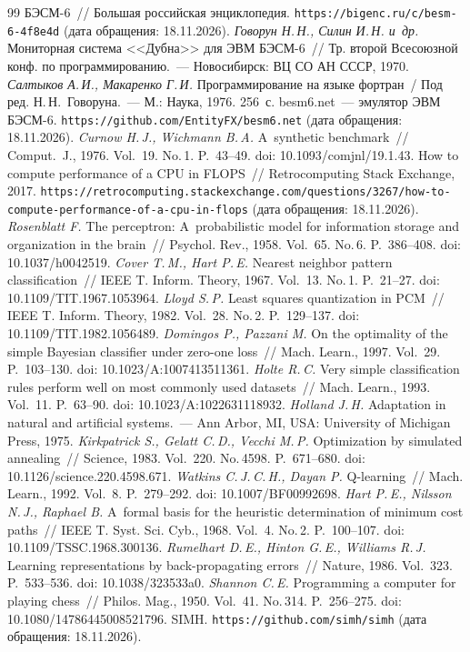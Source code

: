 \documentclass[a4paper,12pt]{article}
\begin{document}
{\small\frenchspacing
  \begin{thebibliography}{99}
БЭСМ-6~// Большая российская энциклопедия. \texttt{https://bigenc.ru/c/besm-6-4f8e4d} (дата обращения: 18.11.2026).
{\it Говорун Н.\,Н., Силин И.\,Н. и~др.} Мониторная система <<Дубна>> для ЭВМ БЭСМ-6~// Тр. второй Всесоюзной конф. по программированию.~--- Новосибирск: ВЦ СО АН СССР, 1970.
{\it Салтыков А.\,И., Макаренко Г.\,И.} Программирование на языке фортран~/ Под ред. Н.\,Н.~Говоруна.~--- М.: Наука, 1976. 256~с.
besm6.net~--- эмулятор ЭВМ БЭСМ-6. \texttt{https://github.com/EntityFX/besm6.net} (дата обращения: 18.11.2026).
{\it Curnow H.\,J., Wichmann B.\,A.} A~synthetic benchmark~// Comput.~J., 1976. Vol.~19. No.\,1. P.~43--49. doi: 10.1093/comjnl/19.1.43.
How to compute performance of a CPU in FLOPS~// Retrocomputing Stack Exchange, 2017. \texttt{https://retrocomputing.stackexchange.com/\allowbreak{}questions/3267/\allowbreak{}how-to-compute-performance-of-a-cpu-in-flops} (дата обращения: 18.11.2026).
{\it Rosenblatt F.} The perceptron: A~probabilistic model for information storage and organization in the brain~// Psychol. Rev., 1958. Vol.~65. No.\,6. P.~386--408. doi: 10.1037/h0042519.
{\it Cover T.\,M., Hart P.\,E.} Nearest neighbor pattern classification~// IEEE T. Inform. Theory, 1967. Vol.~13. No.\,1. P.~21--27. doi: 10.1109/TIT.1967.1053964.
{\it Lloyd S.\,P.} Least squares quantization in PCM~// IEEE T. Inform. Theory, 1982. Vol.~28. No.\,2. P.~129--137. doi: 10.1109/TIT.1982.1056489.
{\it Domingos P., Pazzani M.} On the optimality of the simple Bayesian classifier under zero-one loss~// Mach. Learn., 1997. Vol.~29. P.~103--130. doi: 10.1023/A:1007413511361.
{\it Holte R.\,C.} Very simple classification rules perform well on most commonly used datasets~// Mach. Learn., 1993. Vol.~11. P.~63--90. doi: 10.1023/A:1022631118932.
{\it Holland J.\,H.} Adaptation in natural and artificial systems.~--- Ann Arbor, MI, USA: University of Michigan Press, 1975.
{\it Kirkpatrick S., Gelatt C.\,D., Vecchi M.\,P.} Optimization by simulated annealing~// Science, 1983. Vol.~220. No.\,4598. P.~671--680. doi: 10.1126/science.220.4598.671.
{\it Watkins C.\,J.\,C.\,H., Dayan P.} Q-learning~// Mach. Learn., 1992. Vol.~8. P.~279--292. doi: 10.1007/BF00992698.
{\it Hart P.\,E., Nilsson N.\,J., Raphael B.} A~formal basis for the heuristic determination of minimum cost paths~// IEEE T. Syst. Sci. Cyb., 1968. Vol.~4. No.\,2. P.~100--107. doi: 10.1109/TSSC.1968.300136.
{\it Rumelhart D.\,E., Hinton G.\,E., Williams R.\,J.} Learning representations by back-propagating errors~// Nature, 1986. Vol.~323. P.~533--536. doi: 10.1038/323533a0.
{\it Shannon C.\,E.} Programming a computer for playing chess~// Philos. Mag., 1950. Vol.~41. No.\,314. P.~256--275. doi: 10.1080/14786445008521796.
SIMH. \texttt{https://github.com/simh/simh} (дата обращения: 18.11.2026).
\end{thebibliography}
}
\end{document}
